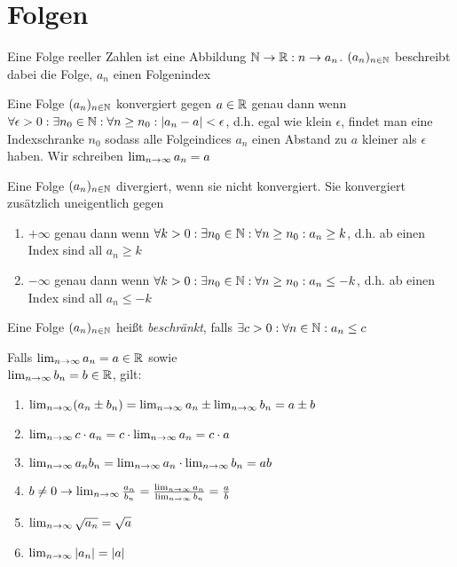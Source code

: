 \section{Folgen}

\begin{definition}
	Eine Folge reeller Zahlen ist eine Abbildung $\mathbb{N} \rightarrow \mathbb{R} : n \rightarrow a_n$. $(a_{n})_{n \in \mathbb{N}}$ beschreibt dabei die Folge, $a_n$ einen Folgenindex
\end{definition}


\begin{definition}
	Eine Folge $(a_{n})_{n \in \mathbb{N}}$ konvergiert gegen $a \in \mathbb{R}$ genau dann wenn \\ $\forall \epsilon > 0 : \exists n_0 \in \mathbb{N} : \forall n \geq n_0 : | a_n - a | < \epsilon$, d.h. egal wie klein $\epsilon$, findet man eine Indexschranke $n_0$ sodass alle Folgeindices $a_n$ einen Abstand zu $a$ kleiner als $\epsilon$ haben. Wir schreiben $\lim_{n \rightarrow \infty} a_n = a$
\end{definition}

\begin{definition}
	Eine Folge $(a_{n})_{n \in \mathbb{N}}$ divergiert, wenn sie nicht konvergiert. Sie konvergiert zusätzlich uneigentlich gegen
	\begin{enumerate}[noitemsep]
		\item $+ \infty$ genau dann wenn $\forall k > 0 : \exists n_0 \in \mathbb{N} : \forall n \geq n_0 : a_n \geq k$, d.h. ab einen Index sind all $a_n \geq k$
		\item $- \infty$ genau dann wenn $\forall k > 0 : \exists n_0 \in \mathbb{N} : \forall n \geq n_0 : a_n \leq -k$, d.h. ab einen Index sind all $a_n \leq -k$		
	\end{enumerate}
\end{definition}

\begin{definition}
	Eine Folge $(a_{n})_{n \in \mathbb{N}}$ heißt \emph{beschränkt}, falls $\exists c > 0 : \forall n \in \mathbb{N} : a_n \leq c$
\end{definition}

\begin{satz}
	Falls $\lim_{n \rightarrow \infty} a_n = a \in \mathbb{R}$ sowie \\ $\lim_{n \rightarrow \infty} b_n = b \in \mathbb{R}$, gilt:
	\begin{enumerate}[noitemsep]
		\item $\lim_{n \rightarrow \infty} (a_n \pm b_n) = \lim_{n \rightarrow \infty} a_n \pm \lim_{n \rightarrow \infty} b_n = a \pm b $
		\item $\lim_{n \rightarrow \infty} c \cdot a_n = c \cdot \lim_{n \rightarrow \infty} a_n = c \cdot a  $
		\item $\lim_{n \rightarrow \infty} a_nb_n = \lim_{n \rightarrow \infty} a_n \cdot \lim_{n \rightarrow \infty} b_n = ab  $
		\item $b \neq 0 \rightarrow\lim_{n \rightarrow \infty} \frac{a_n}{b_n} = \frac{\lim_{n \rightarrow \infty} a_n}{\lim_{n \rightarrow \infty} b_n} = \frac{a}{b} $
		\item $\lim_{n \rightarrow \infty} \sqrt{a_n} = \sqrt{a} $
		\item $\lim_{n \rightarrow \infty} |a_n| = |a| $
	\end{enumerate}
\end{satz}

